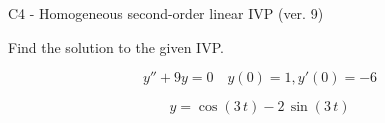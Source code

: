 \begin{exercise}
  \begin{exerciseTitle}C4 - Homogeneous second-order linear IVP (ver. 9)\end{exerciseTitle}
  \begin{exerciseStatement}
    
Find the solution to the given IVP.

    
\[y''+9y = 0 \hspace{1em} y(0) = 1 , y'(0) = -6\]

  \end{exerciseStatement}
  \begin{exerciseAnswer}
    
\[y= \cos\left(3 \, t\right) - 2 \, \sin\left(3 \, t\right)\]

  \end{exerciseAnswer}
\end{exercise}
